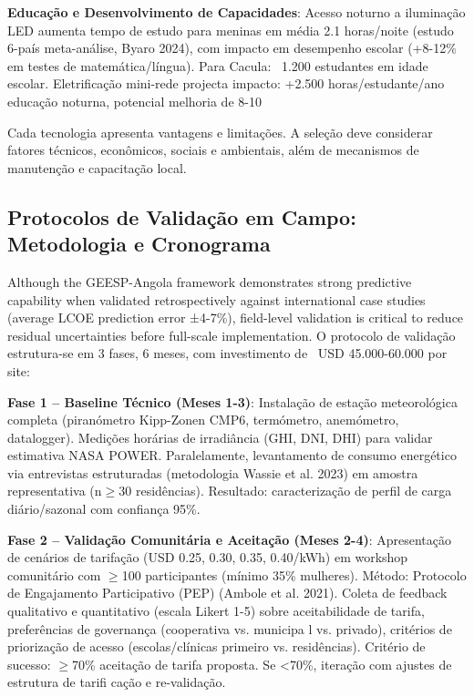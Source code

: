\documentclass[12pt, a4paper]{article}
\begin{document}
\textbf{Educação e Desenvolvimento de Capacidades}: Acesso noturno a iluminação LED aumenta tempo de estudo para meninas em média 2.1 horas/noite (estudo 6-país meta-análise, Byaro 2024), com impacto em desempenho escolar (+8-12\% em testes de matemática/língua). Para Cacula: ~1.200 estudantes em idade escolar. Eletrificação mini-rede projecta impacto: +2.500 horas/estudante/ano educação noturna, potencial melhoria de 8-10%

Cada tecnologia apresenta vantagens e limitações. A seleção deve considerar fatores técnicos, econômicos, sociais e ambientais, além de mecanismos de manutenção e capacitação local.

\subsection{Protocolos de Validação em Campo: Metodologia e Cronograma}

Although the GEESP-Angola framework demonstrates strong predictive capability when validated retrospectively against international case studies (average LCOE prediction error ±4-7\%), field-level validation is critical to reduce residual uncertainties before full-scale implementation. O protocolo de validação estrutura-se em 3 fases, 6 meses, com investimento de ~USD 45.000-60.000 por site:

\textbf{Fase 1 – Baseline Técnico (Meses 1-3)}: Instalação de estação meteorológica completa (piranómetro Kipp-Zonen CMP6, termómetro, anemómetro, datalogger). Medições horárias de irradiância (GHI, DNI, DHI) para validar estimativa NASA POWER. Paralelamente, levantamento de consumo energético via entrevistas estruturadas (metodologia Wassie et al. 2023) em amostra representativa (n$\geq$30 residências). Resultado: caracterização de perfil de carga diário/sazonal com confiança 95\%.

\textbf{Fase 2 – Validação Comunitária e Aceitação (Meses 2-4)}: Apresentação de cenários de tarifação (USD 0.25, 0.30, 0.35, 0.40/kWh) em workshop comunitário com $\geq$100 participantes (mínimo 35\% mulheres). Método: Protocolo de Engajamento Participativo (PEP) (Ambole et al. 2021). Coleta de feedback qualitativo e quantitativo (escala Likert 1-5) sobre aceitabilidade de tarifa, preferências de governança (cooperativa vs. municipa
l vs. privado), critérios de priorização de acesso (escolas/clínicas primeiro vs. residências). Critério de sucesso: $\geq$70\% aceitação de tarifa proposta. Se <70\%, iteração com ajustes de estrutura de tarifi cação e re-validação.
\end{document}
